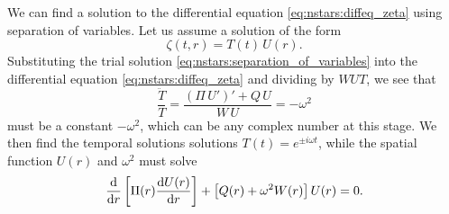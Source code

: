 We can find a solution to the differential equation \eqref{eq:nstars:diffeq_zeta} using separation of variables.
Let us assume a solution of the form
\begin{equation}
	\zeta(t,r) = T(t) \, U(r) .
\label{eq:nstars:separation_of_variables}
\end{equation}
Substituting the trial solution \eqref{eq:nstars:separation_of_variables} into the differential equation \eqref{eq:nstars:diffeq_zeta} and dividing by $W U T$, we see that
\begin{equation}
	\frac{\ddot{T}}{T} = \frac{\left( \Pi \, U' \right)' + Q \, U}{W \, U} = -\omega^2
\end{equation}
must be a constant $-\omega^2$, which can be any complex number at this stage.
We then find the temporal solutions solutions $T(t) = e^{\pm i \omega t}$, while the spatial function $U(r)$ and $\omega^2$ must solve
\begin{equation}
	\odv*{ \left[ \Pi(r) \odv{U(r)}{r} \right] }{r} + \left[ Q(r) + \omega^2 W(r) \right] U(r) = 0 .
\label{eq:nstars:diffeq_U}
\end{equation}

